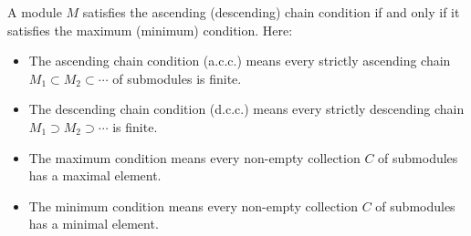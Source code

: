 A module $M$ satisfies the ascending (descending) chain condition if and only if it satisfies the maximum (minimum) condition. Here:
\begin{itemize}
\item The ascending chain condition (a.c.c.) means every strictly ascending chain $M_1 \subset M_2 \subset \cdots$ of submodules is finite.
\item The descending chain condition (d.c.c.) means every strictly descending chain $M_1 \supset M_2 \supset \cdots$ is finite.
\item The maximum condition means every non-empty collection $C$ of submodules has a maximal element.
\item The minimum condition means every non-empty collection $C$ of submodules has a minimal element.
\end{itemize}
